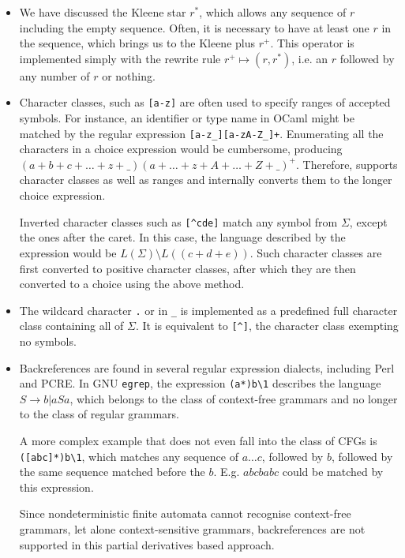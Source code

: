 \begin{itemize}

   \item We have discussed the Kleene star $r^*$, which allows any sequence of
      $r$ including the empty sequence. Often, it is necessary to have at least
      one $r$ in the sequence, which brings us to the Kleene plus $r^+$. This
      operator is implemented simply with the rewrite rule $r^+ \mapsto (r,
      r^*)$, i.e. an $r$ followed by any number of $r$ or nothing.

   \item Character classes, such as \verb'[a-z]' are often used to specify
      ranges of accepted symbols. For instance, an identifier or type name in
      OCaml might be matched by the regular expression \verb'[a-z_][a-zA-Z_]+'.
      Enumerating all the characters in a choice expression would be cumbersome,
      producing $(a+b+c+\dots+z+\_)(a+\dots+z+A+\dots+Z+\_)^+$. Therefore, \reml
      supports character classes as well as ranges and internally converts them
      to the longer choice expression.
      
      Inverted character classes such as \verb'[^cde]' match any symbol from
      $\Sigma$, except the ones after the caret. In this case, the language
      described by the expression would be $L(\Sigma) \setminus L((c+d+e))$.
      Such character classes are first converted to positive character classes,
      after which they are then converted to a choice using the above method.

   \item The wildcard character \verb'.' or in \ocamllex \verb'_' is implemented
      as a predefined full character class containing all of $\Sigma$. It is
      equivalent to \verb'[^]', the character class exempting no symbols.

   \item Backreferences are found in several regular expression dialects,
      including Perl and PCRE. In GNU \texttt{egrep}, the expression
      \verb'(a*)b\1' describes the language $S \to b | a S a$, which belongs to
      the class of context-free grammars and no longer to the class of regular
      grammars.

      A more complex example that does not even fall into the class of CFGs is
      \verb'([abc]*)b\1', which matches any sequence of $a \dots c$, followed by
      $b$, followed by the same sequence matched before the $b$. E.g. $abcbabc$
      could be matched by this expression.

      Since nondeterministic finite automata cannot recognise context-free
      grammars, let alone context-sensitive grammars, backreferences are not
      supported in this partial derivatives based approach.
      
\end{itemize}


